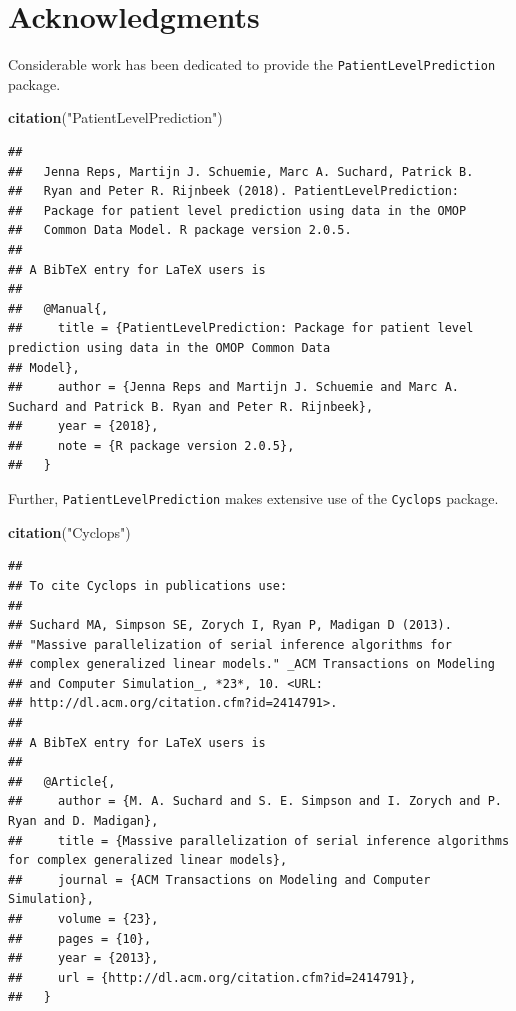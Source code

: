 \documentclass[]{article}
\newenvironment{Shaded}{\begin{snugshade}}{\end{snugshade}}
\newcommand{\KeywordTok}[1]{\textcolor[rgb]{0.13,0.29,0.53}{\textbf{#1}}}
\newcommand{\StringTok}[1]{\textcolor[rgb]{0.31,0.60,0.02}{#1}}
\newcommand{\NormalTok}[1]{#1}
\begin{document}
\newpage

\section{Acknowledgments}\label{acknowledgments}

Considerable work has been dedicated to provide the
\texttt{PatientLevelPrediction} package.

\begin{Shaded}
\begin{Highlighting}[]
\KeywordTok{citation}\NormalTok{(}\StringTok{"PatientLevelPrediction"}\NormalTok{)}
\end{Highlighting}
\end{Shaded}

\begin{verbatim}
## 
##   Jenna Reps, Martijn J. Schuemie, Marc A. Suchard, Patrick B.
##   Ryan and Peter R. Rijnbeek (2018). PatientLevelPrediction:
##   Package for patient level prediction using data in the OMOP
##   Common Data Model. R package version 2.0.5.
## 
## A BibTeX entry for LaTeX users is
## 
##   @Manual{,
##     title = {PatientLevelPrediction: Package for patient level prediction using data in the OMOP Common Data
## Model},
##     author = {Jenna Reps and Martijn J. Schuemie and Marc A. Suchard and Patrick B. Ryan and Peter R. Rijnbeek},
##     year = {2018},
##     note = {R package version 2.0.5},
##   }
\end{verbatim}

Further, \texttt{PatientLevelPrediction} makes extensive use of the
\texttt{Cyclops} package.

\begin{Shaded}
\begin{Highlighting}[]
\KeywordTok{citation}\NormalTok{(}\StringTok{"Cyclops"}\NormalTok{)}
\end{Highlighting}
\end{Shaded}

\begin{verbatim}
## 
## To cite Cyclops in publications use:
## 
## Suchard MA, Simpson SE, Zorych I, Ryan P, Madigan D (2013).
## "Massive parallelization of serial inference algorithms for
## complex generalized linear models." _ACM Transactions on Modeling
## and Computer Simulation_, *23*, 10. <URL:
## http://dl.acm.org/citation.cfm?id=2414791>.
## 
## A BibTeX entry for LaTeX users is
## 
##   @Article{,
##     author = {M. A. Suchard and S. E. Simpson and I. Zorych and P. Ryan and D. Madigan},
##     title = {Massive parallelization of serial inference algorithms for complex generalized linear models},
##     journal = {ACM Transactions on Modeling and Computer Simulation},
##     volume = {23},
##     pages = {10},
##     year = {2013},
##     url = {http://dl.acm.org/citation.cfm?id=2414791},
##   }
\end{verbatim}
\end{document}
